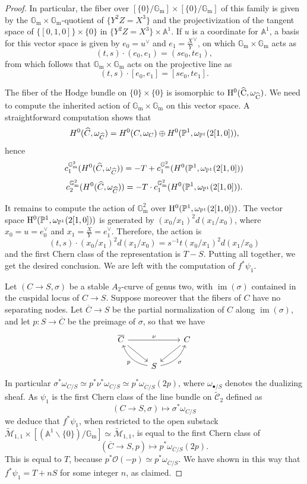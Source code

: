 \documentclass[a4paper, 10pt]{amsart}
\numberwithin{equation}{section}
\numberwithin{subsection}{section}
\theoremstyle{definition}
\theoremstyle{remark}
\renewcommand{\mathcal}{\mathscr}
\newcommand\cO{\mathcal{O}} \newcommand\cP{\mathcal{P}}
\renewcommand\AA{\mathbb{A}} \newcommand\BB{\mathbb{B}}
\newcommand\GG{\mathbb{G}} \newcommand\HH{\mathbb{H}}
\newcommand\rmm{\mathrm{m}} \newcommand\rmn{\mathrm{n}}
\newcommand\im[1]{\operatorname{im}(#1)}
\newcommand{\gm}{\GG_{\rmm}}
\newcommand{\Mtilde}{\widetilde{\mathcal M}}
\newcommand{\Ctilde}{\widetilde{\mathcal C}}
\begin{document}
\begin{proof}
		In particular, the fiber over $[\{0\}/\gm]\times [\{0\}/\gm]$ of this family is given by the $\gm\times\gm$-quotient of $\{Y^2Z=X^3\}$ and the projectivization of the tangent space of $\{[0,1,0]\}\times\{0\}$ in $\{Y^2Z=X^3\}\times \AA^1$. If $u$ is a coordinate for $\AA^1$, a basis for this vector space is given by $e_0=u^{\vee}$ and $e_1=\frac{X}{Y}^{\vee}$, on which $\gm\times\gm$ acts as
		\[ (t,s)\cdot (e_0,e_1) = (se_0,te_1), \]
		from which follows that $\gm\times\gm$ acts on the projective line as
		$$ (t,s)\cdot[e_0,e_1] = [ se_0, te_1].$$
		
		The fiber of the Hodge bundle on $\{0\}\times \{0\}$ is isomorphic to $\rm{H}^0(\widehat{C},\omega_{\widehat{C}})$. We need to compute the inherited action of $\gm\times\gm$ on this vector space. A straightforward computation shows that
		\[ H^0(\widehat{C},\omega_{\widehat{C}})=H^0(C,\omega_C) \oplus H^0(\mathbb{P}^1,\omega_{\mathbb{P}^1}(2[1,0])),\]
		hence
		\[c_1^{\gm^2}(H^0(\widehat{C},\omega_{\widehat{C}}))= -T + c_1^{\gm^2}(H^0(\PP^1,\omega_{\PP^1}(2[1,0]))\]
		\[c_2^{\gm^2}(H^0(\widehat{C},\omega_{\widehat{C}}))= -T\cdot  c_1^{\gm^2}(H^0(\PP^1,\omega_{\PP^1}(2[1,0])).\]
		
		It remains to compute the action of $\gm^2$ over $\rm{H}^0(\mathbb{P}^1,\omega_{\mathbb{P}^1}(2 [1,0]))$.
		The vector space $\rm{H}^0(\mathbb{P}^1,\omega_{\mathbb{P}^1}(2[1,0]))$ is generated by $(x_0/x_1)^2d(x_1/x_0)$, where $x_0=u=e_0^{\vee}$ and $x_1=\frac{X}{Y}=e_1^{\vee}$. Therefore, the action is
		\[ (t,s)\cdot(x_0/x_1)^2d(x_1/x_0) = s^{-1}t (x_0/x_1)^2d(x_1/x_0) \]
		and the first Chern class of the representation is $T-S$. Putting all together, we get the desired conclusion. We are left with the computation of $f^*\psi_1$.
		
		Let $(C\to S,\sigma)$ be a stable $A_2$-curve of genus two, with $\im{\sigma}$ contained in the cuspidal locus of $C\to S$. Suppose moreover that the fibers of $C$ have no separating nodes. Let $\overline{C}\to S$ be the partial normalization of $C$ along $\im{\sigma}$, and let $p:S\to \overline{C}$ be the preimage of $\sigma$, so that we have
		\begin{equation*}
			\begin{tikzcd}
				\overline{C} \ar[rr,"\nu"] \ar[dr] & & C \ar[dl] \\
				& S \ar[ul, bend left, "p"] \ar[ur, bend right, "\sigma"']&
			\end{tikzcd}
		\end{equation*}
		In particular $\sigma^*\omega_{C/S}\simeq p^*\nu^*\omega_{C/S}\simeq p^*\omega_{\overline{C}/S}(2p)$, where $\omega_{\bullet/S}$ denotes the dualizing sheaf.
		As $\psi_1$ is the first Chern class of the line bundle on $\Ctilde_{2}$ defined as
		\[ (C\to S,\sigma)\longmapsto\sigma^*\omega_{C/S} \]
		we deduce that $f^*\psi_1$, when restricted to the open substack $\Mtilde_{1,1}\times[(\AA^1\smallsetminus\{0\})/\gm]\simeq\Mtilde_{1,1}$, is equal to the first Chern class of
		\[ (\overline{C}\to S,p) \longmapsto p^*\omega_{\overline{C}/S}(2p). \]
		This is equal to $T$, because $p^*\cO(-p)\simeq p^*\omega_{\overline{C}/S}$. We have shown in this way that $f^*\psi_1= T + nS$ for some integer $n$, as claimed.
	\end{proof}
	
\end{document}
